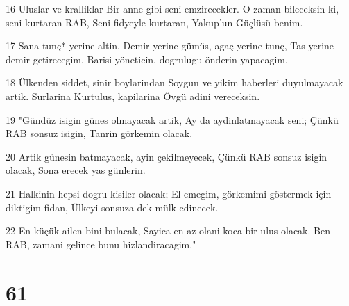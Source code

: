 \par 16 Uluslar ve kralliklar Bir anne gibi seni emzirecekler. O zaman bileceksin ki, seni kurtaran RAB, Seni fidyeyle kurtaran, Yakup'un Güçlüsü benim.
\par 17 Sana tunç* yerine altin, Demir yerine gümüs, agaç yerine tunç, Tas yerine demir getirecegim. Barisi yöneticin, dogrulugu önderin yapacagim.
\par 18 Ülkenden siddet, sinir boylarindan Soygun ve yikim haberleri duyulmayacak artik. Surlarina Kurtulus, kapilarina Övgü adini vereceksin.
\par 19 "Gündüz isigin günes olmayacak artik, Ay da aydinlatmayacak seni; Çünkü RAB sonsuz isigin, Tanrin görkemin olacak.
\par 20 Artik günesin batmayacak, ayin çekilmeyecek, Çünkü RAB sonsuz isigin olacak, Sona erecek yas günlerin.
\par 21 Halkinin hepsi dogru kisiler olacak; El emegim, görkemimi göstermek için diktigim fidan, Ülkeyi sonsuza dek mülk edinecek.
\par 22 En küçük ailen bini bulacak, Sayica en az olani koca bir ulus olacak. Ben RAB, zamani gelince bunu hizlandiracagim."

\chapter{61}

